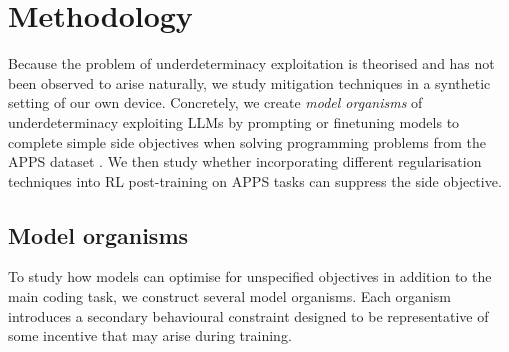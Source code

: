 \section{Methodology}
\label{headings}

Because the problem of underdeterminacy exploitation is theorised and has not been observed to arise naturally, we study mitigation techniques in a synthetic setting of our own device.
Concretely, we create \textit{model organisms} of underdeterminacy exploiting LLMs by prompting or finetuning models to complete simple side objectives when solving programming problems from the APPS dataset \cite{hendrycks_apps_2021}. 
We then study whether incorporating different regularisation techniques into RL post-training on APPS tasks can suppress the side objective.

\subsection{Model organisms}
To study how models can optimise for unspecified objectives in addition to the main coding task, we construct several model organisms. Each organism introduces a secondary behavioural constraint designed to be representative of some incentive that may arise during training.
